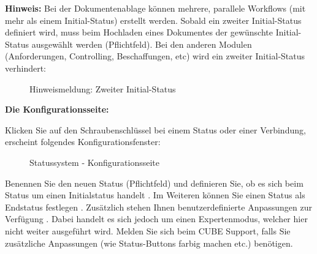 \textbf{Hinweis:}
Bei der Dokumentenablage können mehrere, parallele Workflows (mit mehr als einem Initial-Status) erstellt werden. Sobald ein zweiter Initial-Status definiert wird, muss beim Hochladen eines Dokumentes der gewünschte Initial-Status ausgewählt werden (Pflichtfeld). Bei den anderen Modulen (Anforderungen, Controlling, Beschaffungen, etc) wird ein zweiter Initial-Status verhindert:

\begin{figure}[H]
\caption{Hinweismeldung: Zweiter Initial-Status}
\end{figure}

\textbf{Die Konfigurationsseite:}

Klicken Sie auf den Schraubenschlüssel  bei einem Status oder einer Verbindung, erscheint folgendes Konfigurationsfenster:

\begin{figure}[H]
\caption{Statussystem - Konfigurationsseite}
\end{figure}

Benennen Sie den neuen Status  (Pflichtfeld) und definieren Sie, ob es sich beim Status um einen Initialstatus handelt . Im Weiteren können Sie einen Status als Endstatus festlegen . Zusätzlich stehen Ihnen benutzerdefinierte Anpassungen zur Verfügung . Dabei handelt es sich jedoch um einen Expertenmodus, welcher hier nicht weiter ausgeführt wird. Melden Sie sich beim CUBE Support, falls Sie zusätzliche Anpassungen (wie Status-Buttons farbig machen etc.) benötigen.

